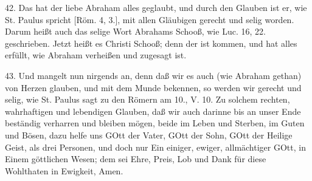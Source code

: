 42. Das hat der liebe Abraham alles geglaubt, und durch den Glauben ist er, wie St. Paulus spricht [Röm. 4, 3.], mit allen Gläubigen gerecht und selig worden. Darum heißt auch das selige Wort Abrahams Schooß, wie Luc. 16, 22. geschrieben. Jetzt heißt es Christi Schooß; denn der ist kommen, und hat alles erfüllt, wie Abraham verheißen und zugesagt ist.

43. Und mangelt nun nirgends an, denn daß wir es auch (wie Abraham gethan) von Herzen glauben, und mit dem Munde bekennen, so werden wir gerecht und selig, wie St. Paulus sagt zu den Römern am 10., V. 10. Zu solchem rechten, wahrhaftigen und lebendigen Glauben, daß wir auch darinne bis an unser Ende beständig verharren und bleiben mögen, beide im Leben und Sterben, im Guten und Bösen, dazu helfe uns GOtt der Vater, GOtt der Sohn, GOtt der Heilige Geist, als drei Personen, und doch nur Ein einiger, ewiger, allmächtiger GOtt, in Einem göttlichen Wesen; dem sei Ehre, Preis, Lob und Dank für diese Wohlthaten in Ewigkeit, Amen.
